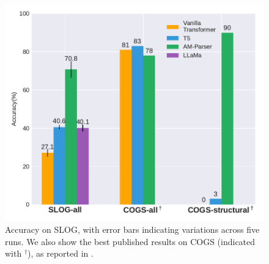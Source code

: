 \begin{figure}[htbp]
  \centering
  \vspace{-4mm}  %
    \includegraphics[scale=0.75]{figures/res_overall_slog_cogs.pdf}
    \vspace{-1mm} 
    \caption{Accuracy on SLOG, with error bars indicating variations across five runs. We also show the best published results on COGS (indicated with $^\dagger$), as reported in \citet{yao-koller-2022-structural}.}
    \label{fig:slog_cogs_res}
    \vspace{-2mm}  %
\end{figure}

